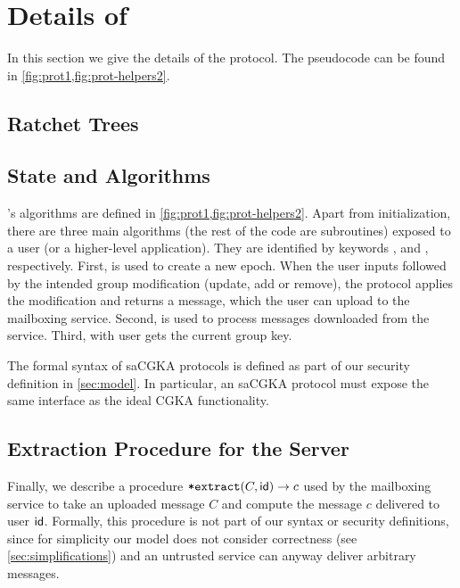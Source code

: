 
\section{Details of \saik} \label{sec:saik-details}

In this section we give the details of the \saik protocol. The pseudocode can be found in \cref{fig:prot1,fig:prot-helpers2}.

\subsection{Ratchet Trees}


\subsection{\saik State and Algorithms}


\saik's algorithms are defined in \cref{fig:prot1,fig:prot-helpers2}. Apart from initialization, there are three main algorithms (the rest of the code are subroutines) exposed to a user (or a higher-level application). They are identified by keywords ,  and , respectively. First,  is used to create a new epoch. When the user inputs  followed by the intended group modification (update, add or remove), the protocol applies the modification and returns a message, which the user can upload to the mailboxing service. Second,  is used to process messages downloaded from the service. Third, with  user gets the current group key.

The formal syntax of saCGKA protocols is defined as part of our security definition in \cref{sec:model}. In particular, an saCGKA protocol must expose the same interface as the ideal CGKA functionality.



\newcommand{\extract}{\method{extract}}
\subsection{Extraction Procedure for the Server}
Finally, we describe a procedure $\extract(C, \id) \to c$ used by the mailboxing service to take an uploaded message $C$ and compute the message $c$ delivered to user ${\mathsf{id}}$. Formally, this procedure is not part of our syntax or security definitions, since for simplicity our model does not consider correctness (see \cref{sec:simplifications}) and an untrusted service can anyway deliver arbitrary messages.

